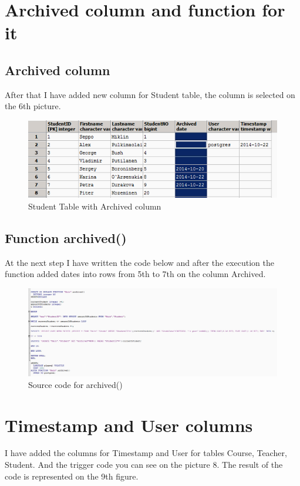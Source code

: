 \documentclass[english]{article}
\begin{document}
\section{Archived column and function for it}
\subsection{Archived column}
After that I have added new column for Student table, the column is selected on the 6th picture. 

\begin{figure}[h]
\centerline{\includegraphics{PLPGSQL/ArchivedStudentTable}}
\caption{Student Table with Archived column}
\end{figure}
\subsection{Function archived()}
At the next step I have written the code below and after the execution the function added dates into rows from 5th to 7th on the column Archived.

\begin{figure}[h]
\centerline{\includegraphics[scale=0.6]{PLPGSQL/ArchivedFunction}}
\caption{Source code for archived()}
\end{figure}

\section{Timestamp and User columns}
I have added the columns for Timestamp and User for tables Course, Teacher, Student. And the trigger code you can see on the picture 8. The result of the code is represented on the 9th figure.
\end{document}
